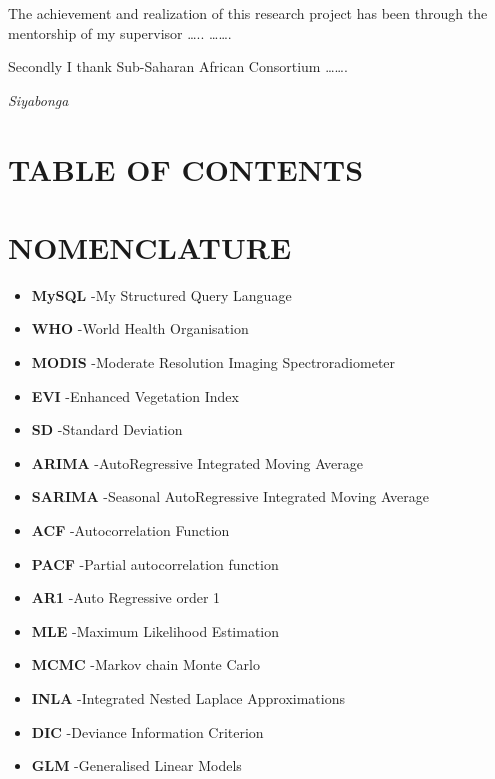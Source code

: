 \documentclass[12pt,]{article}
\providecommand{\tightlist}{%
  \setlength{\itemsep}{0pt}\setlength{\parskip}{0pt}}
\begin{document}
The achievement and realization of this research project has been
through the mentorship of my supervisor \ldots{}.. \ldots{}\ldots{}.

Secondly I thank Sub-Saharan African Consortium \ldots{}\ldots{}.

\emph{Siyabonga} \newline

\newpage

\section{TABLE OF CONTENTS}\label{table-of-contents}

\raggedright
\tableofcontents

\newpage

\raggedright
\listoffigures

\newpage

\listoftables

\newpage

\section{NOMENCLATURE}\label{nomenclature}

\Large

\begin{itemize}
\tightlist
\item
  \textbf{MySQL} -My Structured Query Language
\item
  \textbf{WHO} -World Health Organisation
\item
  \textbf{MODIS } -Moderate Resolution Imaging Spectroradiometer
\item
  \textbf{EVI } -Enhanced Vegetation Index
\item
  \textbf{SD} -Standard Deviation
\item
  \textbf{ARIMA} -AutoRegressive Integrated Moving Average
\item
  \textbf{SARIMA} -Seasonal AutoRegressive Integrated Moving Average
\item
  \textbf{ACF} -Autocorrelation Function
\item
  \textbf{PACF} -Partial autocorrelation function
\item
  \textbf{AR1} -Auto Regressive order 1
\item
  \textbf{MLE } -Maximum Likelihood Estimation
\item
  \textbf{MCMC} -Markov chain Monte Carlo
\item
  \textbf{INLA} -Integrated Nested Laplace Approximations
\item
  \textbf{DIC} -Deviance Information Criterion
\item
  \textbf{GLM} -Generalised Linear Models
\end{itemize}
\end{document}
